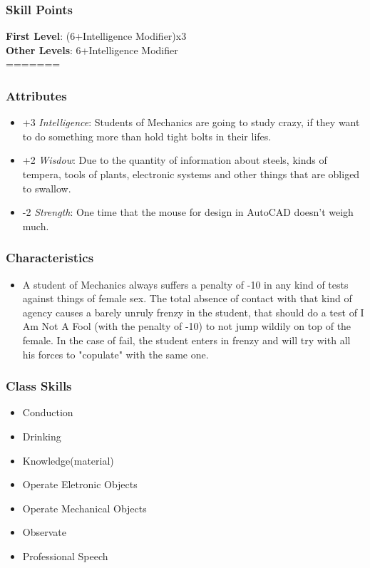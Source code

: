 \documentclass[ letterpaper,12pt]{article}
\begin{document}
\subsubsection{Skill Points}
{\bf First Level}: (6+Intelligence Modifier)x3\\
{\bf Other Levels}: 6+Intelligence Modifier\\
=======
\subsubsection{Attributes}
\begin{itemize}
\item{+3 {\it Intelligence}: Students  of Mechanics are going to study crazy, if they want to  do something more than  hold tight bolts in their lifes.}
\item{+2 {\it Wisdow}: Due  to the quantity of information about steels,  kinds  of   tempera,   tools  of plants,  electronic   systems  and  other things that  are  obliged to swallow.}
\item{-2 {\it Strength}: One  time that the  mouse  for  design  in  AutoCAD doesn't weigh much.}
\end{itemize}


\subsubsection{Characteristics}
\begin{itemize}
\item{A  student  of Mechanics always suffers a penalty of  -10  in  any  kind  of  tests against things of female sex.  The  total absence  of  contact  with  that  kind of agency causes a  barely unruly  frenzy in the  student,  that  should  do a test of I Am Not A Fool (with the penalty of -10) to not jump wildily on top of the female. In the  case  of fail, the student enters in  frenzy  and  will  try  with  all his forces to "copulate" with the same one.}
\end{itemize}

\subsubsection{Class Skills}
\begin{itemize}
\item{Conduction}
\item{Drinking}
\item{Knowledge(material)}
\item{Operate Eletronic Objects}
\item{Operate Mechanical Objects}
\item{Observate}
\item{Professional Speech}
\end{itemize}
\end{document}
